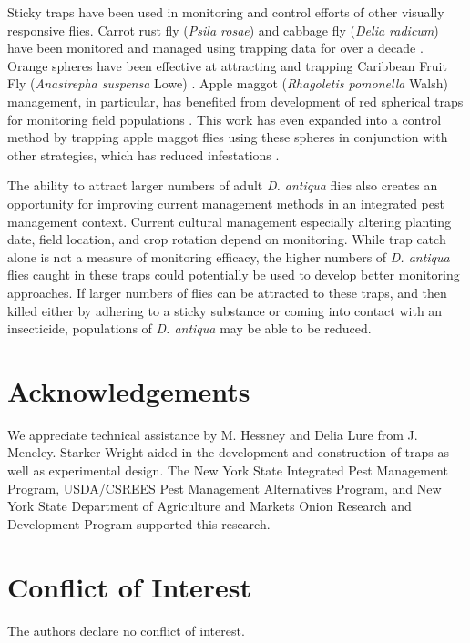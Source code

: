 \documentclass[alpha-refs]{wiley-article}
\begin{document}
Sticky traps have been used in monitoring and control efforts of other visually responsive flies.  Carrot rust fly (\textit{Psila rosae}) and cabbage fly (\textit{Delia radicum}) have been monitored and managed using trapping data for over a decade \citep{stevenson1981carrot,collier1990monitoring,getzin1983carrot, broatch1997comparison, finch1990effectiveness}.   Orange spheres have been effective at attracting and trapping Caribbean Fruit Fly (\textit{Anastrepha suspensa} Lowe) \citep{sivinski1990colored}.  Apple maggot (\textit{Rhagoletis pomonella} Walsh) management, in particular, has benefited from development of red spherical traps for monitoring field populations \citep{prokopy1975apple, drummond1984comparative, duan1994apple}.  This work has even expanded into a control method by trapping apple maggot flies using these spheres in conjunction with other strategies, which has reduced infestations \citep{bostanian1999managing}.  

The ability to attract larger numbers of adult \textit{D. antiqua} flies also creates an opportunity for improving current management methods in an integrated pest management context.  Current cultural management especially altering planting date, field location, and crop rotation depend on monitoring.  While trap catch alone is not a measure of monitoring efficacy, the higher numbers of \textit{D. antiqua} flies caught in these traps could potentially be used to develop better monitoring approaches.  If larger numbers of flies can be attracted to these traps, and then killed either by adhering to a sticky substance or coming into contact with an insecticide, populations of \textit{D. antiqua} may be able to be reduced.  



\section*{Acknowledgements}
We appreciate technical assistance by M. Hessney and Delia Lure from J. Meneley. Starker Wright aided in the development and construction of traps as well as experimental design. The New York State Integrated Pest Management Program, USDA/CSREES Pest Management Alternatives Program, and New York State Department of Agriculture and Markets Onion Research and Development Program supported this research.  

\section*{Conflict of Interest}
The authors declare no conflict of interest.  
\end{document}
